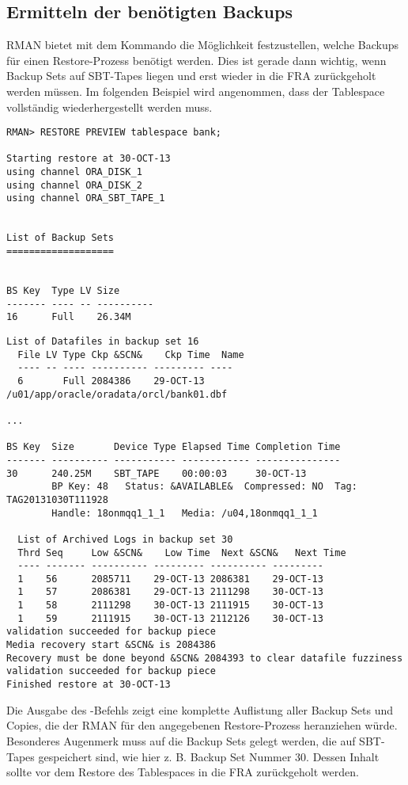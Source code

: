     \subsection{Ermitteln der ben\"otigten Backups}
      RMAN bietet mit dem Kommando  die M\"oglichkeit festzustellen, welche Backups f\"ur einen Restore-Prozess ben\"otigt werden. Dies ist gerade dann wichtig, wenn Backup Sets auf SBT-Tapes liegen und erst wieder in die FRA zur\"uckgeholt werden m\"ussen. Im folgenden Beispiel wird angenommen, dass der Tablespace  vollst\"andig wiederhergestellt werden muss.
      \begin{lstlisting}[caption={Vorschau auf ein Restore},label=admin1439,language=rman]
RMAN> RESTORE PREVIEW tablespace bank;

Starting restore at 30-OCT-13
using channel ORA_DISK_1
using channel ORA_DISK_2
using channel ORA_SBT_TAPE_1


List of Backup Sets
===================


BS Key  Type LV Size
------- ---- -- ----------
16      Full    26.34M
					\end{lstlisting}
\clearpage
					\begin{lstlisting}[language=rman]
  List of Datafiles in backup set 16
  File LV Type Ckp &SCN&    Ckp Time  Name
  ---- -- ---- ---------- --------- ----
  6       Full 2084386    29-OCT-13 /u01/app/oracle/oradata/orcl/bank01.dbf

...

BS Key  Size       Device Type Elapsed Time Completion Time
------- ---------- ----------- ------------ ---------------
30      240.25M    SBT_TAPE    00:00:03     30-OCT-13
        BP Key: 48   Status: &AVAILABLE&  Compressed: NO  Tag: TAG20131030T111928
        Handle: 18onmqq1_1_1   Media: /u04,18onmqq1_1_1

  List of Archived Logs in backup set 30
  Thrd Seq     Low &SCN&    Low Time  Next &SCN&   Next Time
  ---- ------- ---------- --------- ---------- ---------
  1    56      2085711    29-OCT-13 2086381    29-OCT-13
  1    57      2086381    29-OCT-13 2111298    30-OCT-13
  1    58      2111298    30-OCT-13 2111915    30-OCT-13
  1    59      2111915    30-OCT-13 2112126    30-OCT-13
validation succeeded for backup piece
Media recovery start &SCN& is 2084386
Recovery must be done beyond &SCN& 2084393 to clear datafile fuzziness
validation succeeded for backup piece
Finished restore at 30-OCT-13
            \end{lstlisting}
      Die Ausgabe des -Befehls zeigt eine komplette Auflistung aller Backup Sets und Copies, die der RMAN f\"ur den angegebenen Restore-Prozess heranziehen w\"urde. Besonderes Augenmerk muss auf die Backup Sets gelegt werden, die auf SBT-Tapes gespeichert sind, wie hier z. B. Backup Set Nummer 30. Dessen Inhalt sollte vor dem Restore des Tablespaces in die FRA zur\"uckgeholt werden.
